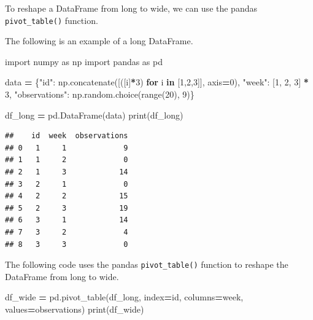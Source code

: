\documentclass[
]{book}
\newenvironment{Shaded}{\begin{snugshade}}{\end{snugshade}}
\newcommand{\BuiltInTok}[1]{#1}
\newcommand{\ControlFlowTok}[1]{\textcolor[rgb]{0.13,0.29,0.53}{\textbf{#1}}}
\newcommand{\DecValTok}[1]{\textcolor[rgb]{0.00,0.00,0.81}{#1}}
\newcommand{\ImportTok}[1]{#1}
\newcommand{\KeywordTok}[1]{\textcolor[rgb]{0.13,0.29,0.53}{\textbf{#1}}}
\newcommand{\NormalTok}[1]{#1}
\newcommand{\OperatorTok}[1]{\textcolor[rgb]{0.81,0.36,0.00}{\textbf{#1}}}
\newcommand{\StringTok}[1]{\textcolor[rgb]{0.31,0.60,0.02}{#1}}
\begin{document}
To reshape a DataFrame from long to wide, we can use the pandas \texttt{pivot\_table()} function.

The following is an example of a long DataFrame.

\begin{Shaded}
\begin{Highlighting}[]
\ImportTok{import}\NormalTok{ numpy }\ImportTok{as}\NormalTok{ np}
\ImportTok{import}\NormalTok{ pandas }\ImportTok{as}\NormalTok{ pd}

\NormalTok{data }\OperatorTok{=}\NormalTok{ \{}\StringTok{"id"}\NormalTok{: np.concatenate([([i]}\OperatorTok{*}\DecValTok{3}\NormalTok{) }\ControlFlowTok{for}\NormalTok{ i }\KeywordTok{in}\NormalTok{ [}\DecValTok{1}\NormalTok{,}\DecValTok{2}\NormalTok{,}\DecValTok{3}\NormalTok{]], axis}\OperatorTok{=}\DecValTok{0}\NormalTok{),}
        \StringTok{"week"}\NormalTok{: [}\DecValTok{1}\NormalTok{, }\DecValTok{2}\NormalTok{, }\DecValTok{3}\NormalTok{] }\OperatorTok{*} \DecValTok{3}\NormalTok{,}
        \StringTok{"observations"}\NormalTok{: np.random.choice(}\BuiltInTok{range}\NormalTok{(}\DecValTok{20}\NormalTok{), }\DecValTok{9}\NormalTok{)\}}

\NormalTok{df\_long }\OperatorTok{=}\NormalTok{ pd.DataFrame(data)}
\BuiltInTok{print}\NormalTok{(df\_long)}
\end{Highlighting}
\end{Shaded}

\begin{verbatim}
##    id  week  observations
## 0   1     1             9
## 1   1     2             0
## 2   1     3            14
## 3   2     1             0
## 4   2     2            15
## 5   2     3            19
## 6   3     1            14
## 7   3     2             4
## 8   3     3             0
\end{verbatim}

The following code uses the pandas \texttt{pivot\_table()} function to reshape the DataFrame from long to wide.

\begin{Shaded}
\begin{Highlighting}[]
\NormalTok{df\_wide }\OperatorTok{=}\NormalTok{ pd.pivot\_table(df\_long,}
\NormalTok{          index}\OperatorTok{=}\StringTok{\textquotesingle{}id\textquotesingle{}}\NormalTok{,}
\NormalTok{          columns}\OperatorTok{=}\StringTok{\textquotesingle{}week\textquotesingle{}}\NormalTok{,}
\NormalTok{          values}\OperatorTok{=}\StringTok{\textquotesingle{}observations\textquotesingle{}}\NormalTok{)}
\BuiltInTok{print}\NormalTok{(df\_wide)}
\end{Highlighting}
\end{Shaded}
\end{document}
